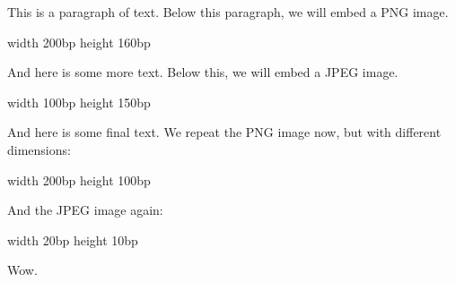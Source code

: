 \edef\pngid{\the\pdflastximage}

\edef\jpegid{\the\pdflastximage}

This is a paragraph of text. Below this paragraph, we will embed a PNG image.

\pdfrefximage \pngid width 200bp height 160bp

And here is some more text. Below this, we will embed a JPEG image.

\pdfrefximage \jpegid width 100bp height 150bp

And here is some final text. We repeat the PNG image now, but with different dimensions:

\pdfrefximage \pngid width 200bp height 100bp

And the JPEG image again:

\pdfrefximage \jpegid width 20bp height 10bp

Wow.

\bye
